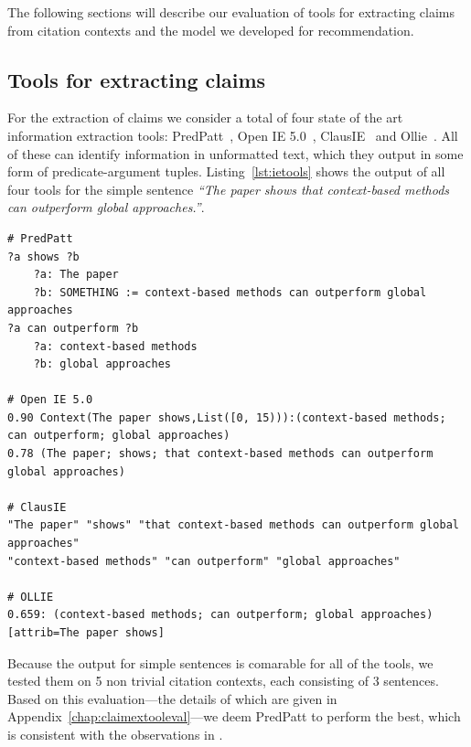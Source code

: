The following sections will describe our evaluation of tools for extracting claims from citation contexts and the model we developed for recommendation.

\subsection{Tools for extracting claims}
For the extraction of claims we consider a total of four state of the art \cite{Zhang2017} information extraction tools: PredPatt~\cite{White2016}, Open IE 5.0~\cite{Mausam2016}, ClausIE~\cite{DelCorro2013} and Ollie~\cite{Mausam2012}. All of these can identify information in unformatted text, which they output in some form of predicate-argument tuples. Listing~\ref{lst:ietools} shows the output of all four tools for the simple sentence \emph{``The paper shows that context-based methods can outperform global approaches.''}.

\begin{lstlisting}[caption={Information extraction tool output examples.},label={lst:ietools}]
# PredPatt
?a shows ?b
    ?a: The paper
    ?b: SOMETHING := context-based methods can outperform global approaches
?a can outperform ?b
    ?a: context-based methods
    ?b: global approaches

# Open IE 5.0
0.90 Context(The paper shows,List([0, 15))):(context-based methods; can outperform; global approaches)
0.78 (The paper; shows; that context-based methods can outperform global approaches)

# ClausIE
"The paper" "shows" "that context-based methods can outperform global approaches"
"context-based methods" "can outperform" "global approaches"

# OLLIE
0.659: (context-based methods; can outperform; global approaches)[attrib=The paper shows]
\end{lstlisting}

Because the output for simple sentences is comarable for all of the tools, we tested them on 5 non trivial citation contexts, each consisting of 3 sentences. Based on this evaluation---the details of which are given in Appendix~\ref{chap:claimextooleval}---we deem PredPatt to perform the best, which is consistent with the observations in \cite{Zhang2017}.



